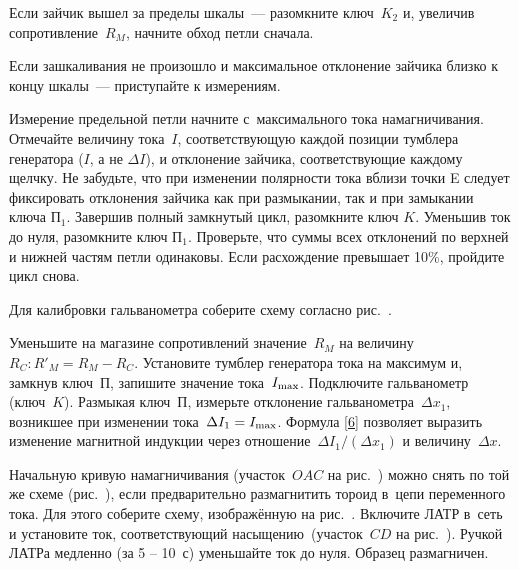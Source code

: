 \begin{lab:task}
	Если зайчик вышел за пределы шкалы~--- разомкните ключ~$K_2$ и, увеличив
сопротивление~$R_M$, начните обход петли
	сначала.

	Если зашкаливания не произошло и максимальное отклонение зайчика близко к
концу шкалы~--- приступайте к измерениям.


	\item Измерение предельной петли начните с~максимального тока
намагничивания. Отмечайте величину тока~$I$, соответствующую
	каждой позиции тумблера генератора ($I$, а не $\Delta I$), и отклонение
зайчика, соответствующие каждому щелчку.
	Не забудьте, что при изменении полярности тока вблизи точки E следует
фиксировать отклонения зайчика как при размыкании, так и при замыкании ключа
$\text{П}_1$.
	Завершив полный  замкнутый цикл,  разомкните ключ $K$. Уменьшив ток до нуля,
разомкните ключ $\text{П}_1$.
	Проверьте, что суммы всех отклонений по верхней и нижней частям петли
одинаковы. Если расхождение превышает 10\%, пройдите цикл снова.


	\item Для калибровки гальванометра соберите схему согласно
рис.~.

	Уменьшите на магазине сопротивлений значение~$R_M$ на
	величину~$R_C: R'_M=R_M-R_C$. Установите тумблер генератора тока на максимум
и, замкнув ключ~$\text{П}$, запишите значение
	тока~$I_{\rm max}$. Подключите гальванометр (ключ~$K$). Размыкая
ключ~$\text{П}$, измерьте отклонение гальванометра~$\Delta x_1$,
	возникшее при изменении тока~$\Delta I_1=I_{\rm max}$. Формула \eqref{6}
позволяет выразить изменение магнитной индукции через
	отношение~$\Delta I_1/(\Delta x_1)$ и величину~$\Delta x$.


	\item Начальную кривую намагничивания (участок~$OAC$ на
рис.~) можно снять по той же схеме
(рис.~), если предварительно
	размагнитить тороид в~цепи переменного тока. Для этого соберите схему,
изображённую на рис.~. Включите ЛАТР в~сеть и
	установите ток, соответствующий насыщению~(участок~$CD$ на
рис.~). Ручкой ЛАТРа медленно (за 5 -- 10~с)
уменьшайте ток до
	нуля. Образец размагничен.


\end{lab:task}
